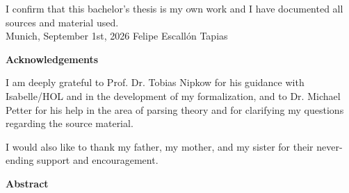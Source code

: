 \documentclass[11pt,
               a4paper,
               bibtotoc,
               idxtotoc,
               headsepline,
               footsepline,
               footexclude,
               BCOR12mm,
               DIV13,
               openany,   %
               ]
               {scrbook}
\def\doctype{Bachelor's Thesis\xspace}
\def\author{Felipe Escall\'{o}n Tapias}
\def\date{September 1st, 2026}
\begin{document}
\addtolength{\hoffset}{\bcorcor}
\newpage


\cleardoubleemptypage

\thispagestyle{empty}
\vspace*{0.7\textheight}
\noindent
I confirm that this \MakeLowercase{\doctype} is my own work and I have documented all sources and material used.\\

\vspace{15mm}
\noindent
Munich, \date \hspace{5cm} \author
\cleardoubleemptypage


{}
\vspace*{2cm}
\begin{center}
    {\Large \bf Acknowledgements}
\end{center}
\vspace{1cm}

I am deeply grateful to Prof. Dr. Tobias Nipkow for his guidance with Isabelle/HOL and in the
development of my formalization, and to Dr. Michael Petter for his help in the area of parsing
theory and for clarifying my questions regarding the source material.

I would also like to thank my father, my mother, and my sister for their never-ending support and
encouragement.

\cleardoublepage


{}
\vspace*{2cm}
\begin{center}
    {\Large \bf Abstract}
\end{center}
\vspace{1cm}
\end{document}
